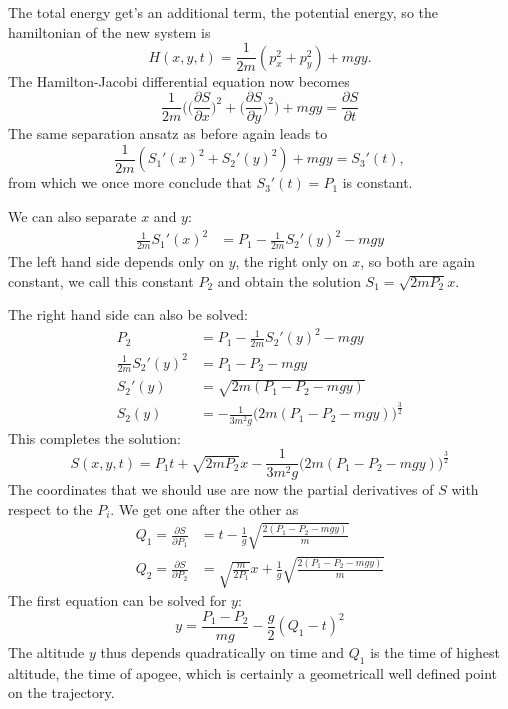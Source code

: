 The total energy get's an additional term, the potential energy,
so the hamiltonian of the new system is
\[
H(x,y,t)=\frac1{2m}(p_x^2+p_y^2)+mgy.
\]
The Hamilton-Jacobi differential equation now becomes
\[
\frac1{2m}\biggl(
\biggl(\frac{\partial S}{\partial x}\biggr)^2
+
\biggl(\frac{\partial S}{\partial y}\biggr)^2
\biggr)
+mgy=\frac{\partial S}{\partial t} 
\]
The same separation ansatz as before again leads to
\[
\frac1{2m}(S_1'(x)^2+S_2'(y)^2)+mgy=S_3'(t),
\]
from which we once more conclude that $S_3'(t)=P_1$ is constant.

We can also separate $x$ and $y$:
\begin{align*}
\frac1{2m}S_1'(x)^2&=P_1-\frac1{2m}S_2'(y)^2-mgy
\end{align*}
The left hand side depends only on $y$, the right only on $x$, so
both are again constant, we call this constant $P_2$ and obtain the solution
$S_1=\sqrt{2mP_2} x$.

The right hand side can also be solved:
\begin{align*}
P_2&=
P_1-\frac1{2m}S_2'(y)^2-mgy
\\
\frac1{2m}S_2'(y)^2
&=
P_1-P_2-mgy
\\
S_2'(y)&=\sqrt{
2m(P_1-P_2-mgy)
}
\\
S_2(y)
&=
-\frac1{3m^2g}\bigl(2m(P_1-P_2-mgy)\bigr)^{\frac32}
\end{align*}
This completes the solution:
\[
S(x,y,t)=P_1t+\sqrt{2mP_2}x
-
\frac1{3m^2g}\bigl(2m(P_1-P_2-mgy)\bigr)^{\frac32}
\]
The coordinates that we should use are now the partial derivatives
of $S$ with respect to the $P_i$.
We get one after the other as
\begin{equation}
\begin{aligned}
Q_1=\frac{\partial S}{\partial P_1}
&=
t-
\frac1{g}\sqrt{\frac{2(P_1-P_2-mgy)}{m}}
\\
Q_2=\frac{\partial S}{\partial P_2}
&=
\sqrt{\frac{m}{2P_1}}x
+
\frac1{g}\sqrt{\frac{2(P_1-P_2-mgy)}{m}}
\end{aligned}
\label{jacobi:aufloesung}
\end{equation}
The first equation can be solved for $y$:
\begin{equation}
y=
\frac{P_1-P_2}{mg}-\frac{g}{2}(Q_1-t)^2
\label{jacobi:quadratisch}
\end{equation}
The altitude $y$ thus depends quadratically on time and $Q_1$ is
the time of highest altitude, the time of apogee, which is certainly
a geometricall well defined point on the trajectory.

